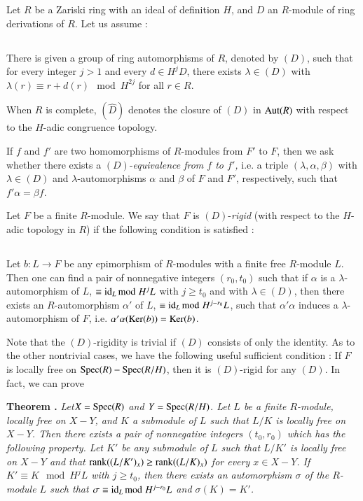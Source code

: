 Let $R$ be a Zariski ring with an ideal of definition $H$, and $D$ an $R$-module of ring derivations of $R$. Let us assume :

\subsection{}\label{art10-sec2.1}
There is given a group of ring automorphisms of $R$, denoted by $(D)$, such that for every integer $j>1$ and every $d\in H^{j}D$, there exists $\lambda\in (D)$ with $\lambda(r)\equiv r+d(r)\mod H^{2j}$ for all $r\in R$.

When $R$ is complete, $(\widehat{D})$ denotes the closure of $(D)$ in $\operatorname{\mathrm{Aut}}(R)$ with respect to the $H$-adic congruence topology.

If $f$ and $f'$ are two homomorphisms of $R$-modules from $F'$ to $F$, then we ask whether there exists a $(D)$-{\em equivalence from $f$ to $f'$,} i.e. a triple $(\lambda,\alpha,\beta)$ with $\lambda\in (D)$ and $\lambda$-automorphisms $\alpha$ and $\beta$ of $F$ and $F'$, respectively, such that $f'\alpha=\beta f$.

Let $F$ be a finite $R$-module. We say that $F$ is $(D)$-{\em rigid} (with respect to the $H$-adic topology in $R$) if the following condition is satisfied :

\subsection{}\label{art10-sec2.2}
Let $b:L\to F$ be any epimorphism of $R$-modules with a finite free $R$-module $L$. Then one can find a pair of nonnegative integers $(r_{0},t_{0})$ such that if $\alpha$ is a $\lambda$-automorphism of $L$, $\equiv \operatorname{\mathrm{id}}_{L}{\rm{mod}}\kern.3em H^{j}L$ with $j\geq t_{0}$ and with $\lambda\in (D)$, then there exists an $R$-automorphism $\alpha'$ of $L$, $\equiv \operatorname{\mathrm{id}}_{L}{\rm{mod}}\kern.3em H^{j-r_{0}}L$, such that $\alpha'\alpha$ induces a $\lambda$-automorphism of $F$, i.e. $\alpha'\alpha(\operatorname{\mathrm{Ker}}(b))=\operatorname{\mathrm{Ker}}(b)$.

Note that the $(D)$-rigidity is trivial if $(D)$ consists of only the identity. As to the other nontrivial cases, we have the following useful sufficient condition : If $F$ is locally free on $\operatorname{Spec}(R)-\operatorname{Spec} (R/H)$, then it is $(D)$-rigid for any $(D)$. In fact, we can prove 

\medskip
\noindent
{\bf Theorem .\label{art10-sec2-thm2.3}}
{\em Let\pageoriginale $X=\operatorname{Spec} (R)$ and $Y=\operatorname{Spec} (R/H)$. Let $L$ be a finite $R$-module, locally free on $X-Y$, and $K$ a submodule of $L$ such that $L/K$ is locally free on $X-Y$. Then there exists a pair of nonnegative integers $(t_{0},r_{0})$ which has the following property. Let $K'$ be any submodule of $L$ such that $L/K'$ is locally free on $X-Y$ and that $\operatorname{\mathrm{rank}} ((L/K')_{x})\geq \operatorname{\mathrm{rank}} ((L/K)_{x})$ for every $x\in X-Y$. If $K'\equiv K\mod H^{j}L$ with $j\geq t_{0}$, then there exists an automorphism $\sigma$ of the $R$-module $L$ such that $\sigma\equiv \operatorname{\mathrm{id}}_{L}{\rm{mod}}\kern.3em H^{j-r_{0}}L$ and $\sigma(K)=K'$.}
\smallskip

